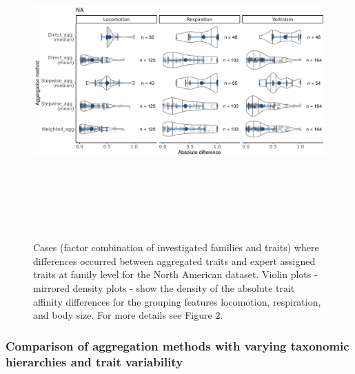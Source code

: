 \documentclass[12pt]{article}
\begin{document}
\begin{figure}[H]
    \centering
    \includegraphics[width=15cm, height=12cm]{Deviances_trait_agg_pyne.png}
    \caption{Cases (factor combination of investigated families and traits) where differences occurred between aggregated traits and expert assigned traits at family level for the North American dataset. Violin plots - mirrored density plots - show the density of the absolute trait affinity differences for the grouping features locomotion, respiration, and body size. For more details see Figure 2.}%
    \label{fig:diff_aggr_traits_pyne}
\end{figure}

\subsubsection*{Comparison of aggregation methods with varying taxonomic hierarchies and trait variability}
\end{document}
